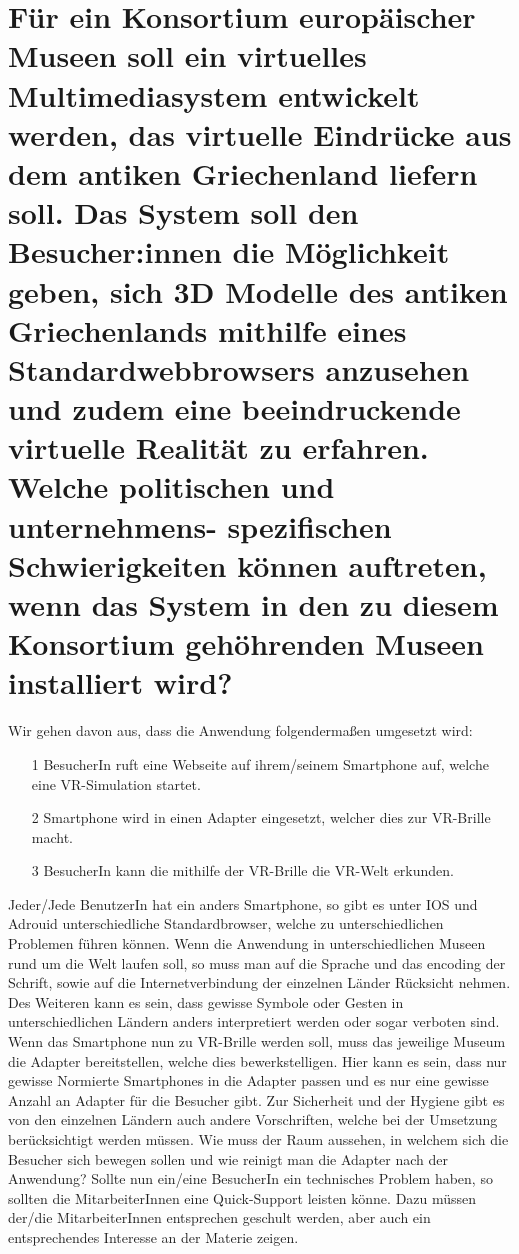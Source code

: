 \documentclass[12pt]{article}
\begin{document}
\section{Für ein Konsortium europäischer Museen soll ein virtuelles Multimediasystem entwickelt werden, das virtuelle Eindrücke aus dem antiken Griechenland liefern soll. Das System soll den Besucher:innen die Möglichkeit geben, sich 3D Modelle des antiken Griechenlands mithilfe eines Standardwebbrowsers anzusehen und zudem eine beeindruckende virtuelle Realität zu erfahren. Welche politischen und unternehmens-
spezifischen Schwierigkeiten können auftreten, wenn das System in den zu diesem Konsortium gehöhrenden Museen installiert wird?}
Wir gehen davon aus, dass die Anwendung folgendermaßen umgesetzt wird:
\begin{itemize}
 \item [1] BesucherIn ruft eine Webseite auf ihrem/seinem Smartphone auf, welche eine VR-Simulation startet.
 \item [2] Smartphone wird in einen Adapter eingesetzt, welcher dies zur VR-Brille macht.
 \item [3] BesucherIn kann die mithilfe der VR-Brille die VR-Welt erkunden.
\end{itemize}
Jeder/Jede BenutzerIn hat ein anders Smartphone, so gibt es unter IOS und Adrouid unterschiedliche Standardbrowser, welche zu unterschiedlichen Problemen führen können. Wenn die Anwendung in unterschiedlichen Museen rund um die Welt laufen soll, so muss man auf die Sprache und das encoding der Schrift, sowie auf die Internetverbindung der einzelnen Länder Rücksicht nehmen. Des Weiteren kann es sein, dass gewisse Symbole oder Gesten in unterschiedlichen Ländern anders interpretiert werden oder sogar verboten sind. Wenn das Smartphone nun zu VR-Brille werden soll, muss das jeweilige Museum die Adapter bereitstellen, welche dies bewerkstelligen. Hier kann es sein, dass nur gewisse Normierte Smartphones in die Adapter passen und es nur eine gewisse Anzahl an Adapter für die Besucher gibt. Zur Sicherheit und der Hygiene gibt es von den einzelnen Ländern auch andere Vorschriften, welche bei der Umsetzung berücksichtigt werden müssen. Wie muss der Raum aussehen, in welchem sich die Besucher sich bewegen sollen und wie reinigt man die Adapter nach der Anwendung? Sollte nun ein/eine BesucherIn ein technisches Problem haben, so sollten die MitarbeiterInnen eine Quick-Support leisten könne. Dazu müssen der/die MitarbeiterInnen entsprechen geschult werden, aber auch ein entsprechendes Interesse an der Materie zeigen.
\end{document}
